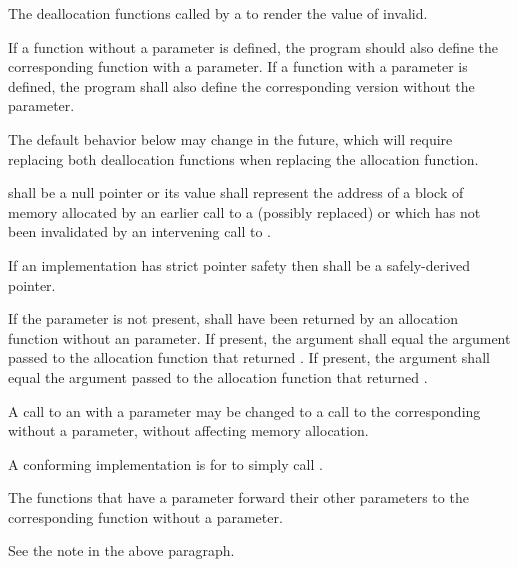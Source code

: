 \begin{itemdescr}
\pnum
\effects
The
deallocation functions
called by a
to render the value of  invalid.

\pnum
\replaceable
{}
If a function without a  parameter is defined,
the program should also define
the corresponding function with a  parameter.
If a function with a  parameter is defined,
the program shall also define
the corresponding version without the  parameter.
\begin{note}
The default behavior below may change in the future, which will require
replacing both deallocation functions when replacing the allocation function.
\end{note}

\pnum
\requires
{} shall be a null pointer or
its value shall represent the address of
a block of memory allocated by
an earlier call to a (possibly replaced)
or
which has not been invalidated by an intervening call to
.

\pnum
\requires
If an implementation has strict pointer safety
then  shall be a safely-derived pointer.

\pnum
\requires
If the  parameter is not present,
 shall have been returned by an allocation function
without an  parameter.
If present, the  argument
shall equal the  argument
passed to the allocation function that returned .
If present, the  argument
shall equal the  argument
passed to the allocation function that returned .

\pnum
\required
A call to an 
with a  parameter
may be changed to
a call to the corresponding 
without a  parameter,
without affecting memory allocation.
\begin{note} A conforming implementation is for
 to simply call
. \end{note}

\pnum
{}
The functions that have a  parameter
forward their other parameters
to the corresponding function without a  parameter.
\begin{note} See the note in the above \replaceable paragraph. \end{note}


\end{itemdescr}
